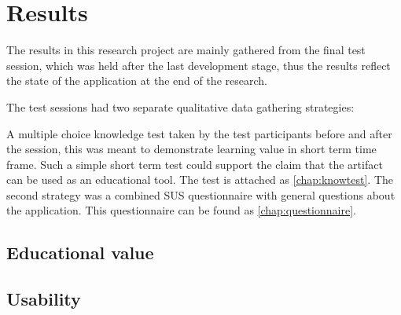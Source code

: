 


\chapter{Results}\label{chap:results}




The results in this research project are mainly gathered from the final test session, which was held after the last development stage, thus the results reflect the state of the application at the end of the research. 

The test sessions had two separate qualitative data gathering strategies: 

A multiple choice knowledge test taken by the test participants before and after the session,  this was meant to demonstrate learning value in short term time frame. Such a simple short term test could support the claim that the artifact can be used as an educational tool. The test is attached as \autoref{chap:knowtest}.
The second strategy was a combined SUS questionnaire with general questions about the application. This questionnaire can be found as \autoref{chap:questionnaire}.


\section{Educational value}





\section{Usability}




